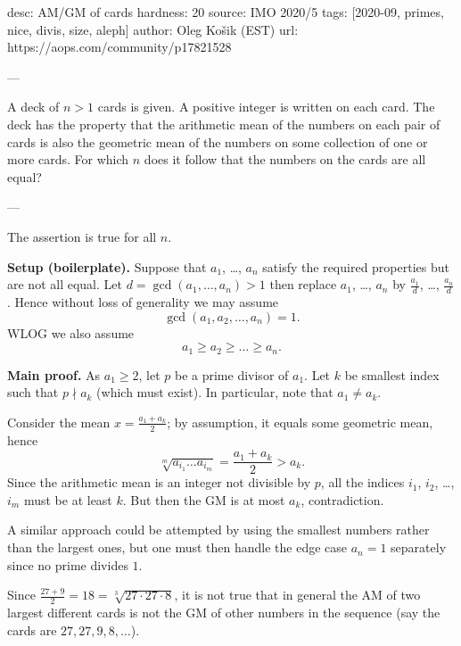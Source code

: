 desc: AM/GM of cards
hardness: 20
source: IMO 2020/5
tags: [2020-09, primes, nice, divis, size, aleph]
author: Oleg Ko\v{s}ik (EST)
url: https://aops.com/community/p17821528

---

A deck of $n > 1$ cards is given.
A positive integer is written on each card.
The deck has the property that the arithmetic mean of the
numbers on each pair of cards is also the
geometric mean of the numbers on some collection of one or more cards.
For which $n$ does it follow that the numbers on the cards are all equal?

---

The assertion is true for all $n$.

\bigskip

\textbf{Setup (boilerplate).}
Suppose that $a_1$, \dots, $a_n$ satisfy the required properties
but are not all equal.
Let $d = \gcd(a_1, \dots, a_n) > 1$
then replace $a_1$, \dots, $a_n$ by
$\frac{a_1}{d}$, \dots, $\frac{a_n}{d}$.
Hence without loss of generality we may assume
\[ \gcd(a_1, a_2, \dots, a_n) = 1. \]
WLOG we also assume \[ a_1 \ge a_2 \ge \dots \ge a_n. \]

\bigskip

\textbf{Main proof.}
As $a_1 \ge 2$, let $p$ be a prime divisor of $a_1$.
Let $k$ be smallest index such that $p \nmid a_k$ (which must exist).
In particular, note that $a_1 \neq a_k$.

Consider the mean $x = \frac{a_1+a_k}{2}$; by assumption,
it equals some geometric mean, hence
\[ \sqrt[m]{a_{i_1} \dots a_{i_m}} = \frac{a_1 + a_k}{2} > a_k. \]
Since the arithmetic mean is an integer not divisible by $p$,
all the indices $i_1$, $i_2$, \dots, $i_m$
must be at least $k$.
But then the GM is at most $a_k$, contradiction.

\begin{remark*}
  A similar approach could be attempted by using
  the smallest numbers rather than the largest ones,
  but one must then handle the edge case $a_n = 1$
  separately since no prime divides $1$.
\end{remark*}

\begin{remark*}
  Since $\frac{27+9}{2} = 18 = \sqrt[3]{27 \cdot 27 \cdot 8}$,
  it is not true that in general the AM of two largest different cards
  is not the GM of other numbers in the sequence
  (say the cards are $27, 27, 9, 8, \dots$).
\end{remark*}
